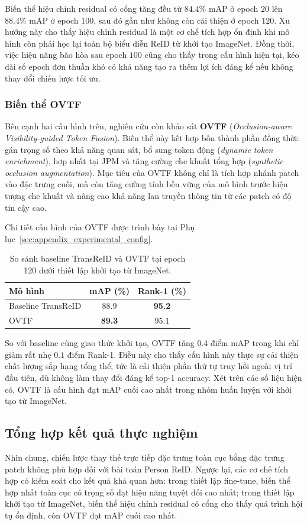 Biến thể hiệu chỉnh residual có cổng tăng đều từ $84.4\%$ mAP ở epoch $20$ lên $88.4\%$ mAP ở epoch $100$, sau đó gần như không còn cải thiện ở epoch $120$. Xu hướng này cho thấy hiệu chỉnh residual là một cơ chế tích hợp ổn định khi mô hình còn phải học lại toàn bộ biểu diễn ReID từ khởi tạo ImageNet. Đồng thời, việc hiệu năng bão hòa sau epoch $100$ cũng cho thấy trong cấu hình hiện tại, kéo dài số epoch đơn thuần khó có khả năng tạo ra thêm lợi ích đáng kể nếu không thay đổi chiến lược tối ưu.

\subsubsection{Biến thể OVTF}

Bên cạnh hai cấu hình trên, nghiên cứu còn khảo sát \textbf{OVTF}
(\textit{Occlusion-aware Visibility-guided Token Fusion}). Biến thể này kết hợp
bốn thành phần đồng thời: gán trọng số theo khả năng quan sát, bổ sung token
động (\textit{dynamic token enrichment}), hợp nhất tại JPM và tăng cường che
khuất tổng hợp (\textit{synthetic occlusion augmentation}). Mục tiêu của OVTF
không chỉ là tích hợp nhánh patch vào đặc trưng cuối, mà còn tăng cường tính
bền vững của mô hình trước hiện tượng che khuất và nâng cao khả năng lan truyền
thông tin từ các patch có độ tin cậy cao.

Chi tiết cấu hình của OVTF được trình bày tại
Phụ lục~\ref{sec:appendix_experimental_config}.

\begin{table}[!htbp]
\centering
\renewcommand{\arraystretch}{1.10}
\begin{tabular}{@{}L{4.8cm}cc@{}}
\toprule
\textbf{Mô hình} & \textbf{mAP (\%)} & \textbf{Rank-1 (\%)} \\
\midrule
Baseline TransReID & 88.9 & \textbf{95.2} \\
OVTF & \textbf{89.3} & 95.1 \\
\bottomrule
\end{tabular}
\caption{So sánh baseline TransReID và OVTF tại epoch 120 dưới thiết lập khởi
tạo từ ImageNet.}
\label{tab:e1_compare}
\end{table}

So với baseline cùng giao thức khởi tạo, OVTF tăng $0.4$ điểm mAP trong khi chỉ
giảm rất nhẹ $0.1$ điểm Rank-1. Điều này cho thấy cấu hình này thực sự cải
thiện chất lượng sắp hạng tổng thể, tức là cải thiện phần thứ tự truy hồi ngoài
vị trí đầu tiên, dù không làm thay đổi đáng kể top-1 accuracy. Xét trên các số
liệu hiện có, OVTF là cấu hình đạt mAP cuối cao nhất trong nhóm huấn
luyện với khởi tạo từ ImageNet.

\subsection{Tổng hợp kết quả thực nghiệm}

Nhìn chung, chiến lược thay thế trực tiếp đặc trưng toàn cục bằng đặc trưng
patch không phù hợp đối với bài toán Person ReID. Ngược lại, các cơ chế tích hợp có
kiểm soát cho kết quả khả quan hơn: trong thiết lập fine-tune, biến thể hợp
nhất toàn cục có trọng số đạt hiệu năng tuyệt đối cao nhất; trong thiết lập
khởi tạo từ ImageNet, biến thể hiệu chỉnh residual có cổng cho thấy quá trình
hội tụ ổn định, còn OVTF đạt mAP cuối cao nhất.
